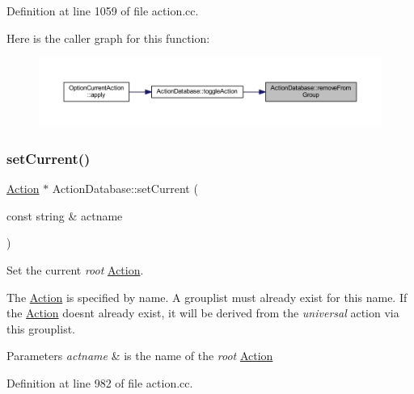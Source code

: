 Definition at line 1059 of file action.\+cc.

Here is the caller graph for this function\+:
\nopagebreak
\begin{figure}[H]
\begin{center}
\leavevmode
\includegraphics[width=350pt]{class_action_database_af5e2e83dbc5ec8baa906081101307c74_icgraph}
\end{center}
\end{figure}
\mbox{\label{class_action_database_a19e09431e4e66936090715ab8afe774b}} 
\subsubsection{\texorpdfstring{setCurrent()}{setCurrent()}}
{\footnotesize\ttfamily \mbox{\hyperlink{class_action}{Action}} $\ast$ Action\+Database\+::set\+Current (\begin{DoxyParamCaption}\item[{const string \&}]{actname }\end{DoxyParamCaption})}



Set the current {\itshape root} \mbox{\hyperlink{class_action}{Action}}. 

The \mbox{\hyperlink{class_action}{Action}} is specified by name. A grouplist must already exist for this name. If the \mbox{\hyperlink{class_action}{Action}} doesn\textquotesingle{}t already exist, it will be derived from the {\itshape universal} action via this grouplist. 
\begin{DoxyParams}{Parameters}
{\em actname} & is the name of the {\itshape root} \mbox{\hyperlink{class_action}{Action}} \\
\hline
\end{DoxyParams}


Definition at line 982 of file action.\+cc.


